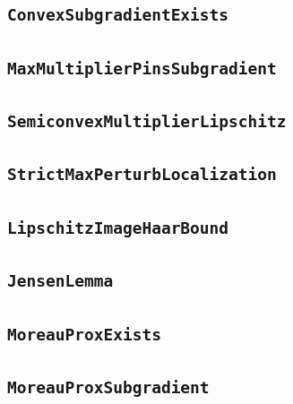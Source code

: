 \documentclass[11pt]{amsart}
\theoremstyle{definition}
\begin{document}
\subsection{\texorpdfstring{\texttt{ConvexSubgradientExists}}{ConvexSubgradientExists}}\label{node:ConvexSubgradientExists}


\subsection{\texorpdfstring{\texttt{MaxMultiplierPinsSubgradient}}{MaxMultiplierPinsSubgradient}}\label{node:MaxMultiplierPinsSubgradient}


\subsection{\texorpdfstring{\texttt{SemiconvexMultiplierLipschitz}}{SemiconvexMultiplierLipschitz}}\label{node:SemiconvexMultiplierLipschitz}


\subsection{\texorpdfstring{\texttt{StrictMaxPerturbLocalization}}{StrictMaxPerturbLocalization}}\label{node:StrictMaxPerturbLocalization}


\subsection{\texorpdfstring{\texttt{LipschitzImageHaarBound}}{LipschitzImageHaarBound}}\label{node:LipschitzImageHaarBound}


\subsection{\texorpdfstring{\texttt{JensenLemma}}{JensenLemma}}\label{node:JensenLemma}


\subsection{\texorpdfstring{\texttt{MoreauProxExists}}{MoreauProxExists}}\label{node:MoreauProxExists}


\subsection{\texorpdfstring{\texttt{MoreauProxSubgradient}}{MoreauProxSubgradient}}\label{node:MoreauProxSubgradient}

\end{document}
